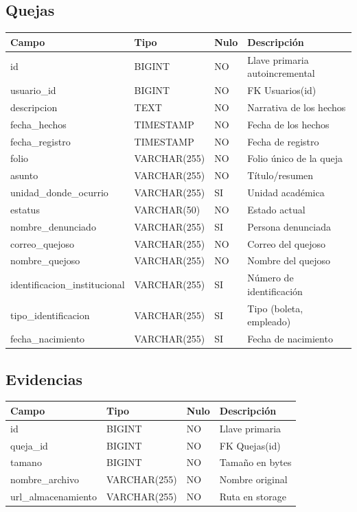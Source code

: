 \documentclass[11pt,letterpaper]{article}
\begin{document}
\subsection{Quejas}
\begin{longtable}{|p{4.2cm}|p{3.2cm}|p{2.2cm}|p{4.5cm}|}
\hline
\rowcolor{lightgray} \textbf{Campo} & \textbf{Tipo} & \textbf{Nulo} & \textbf{Descripción} \\
\hline
id & BIGINT & NO & Llave primaria autoincremental \\
\hline
usuario\_id & BIGINT & NO & FK Usuarios(id) \\
\hline
descripcion & TEXT & NO & Narrativa de los hechos \\
\hline
fecha\_hechos & TIMESTAMP & NO & Fecha de los hechos \\
\hline
fecha\_registro & TIMESTAMP & NO & Fecha de registro \\
\hline
folio & VARCHAR(255) & NO & Folio único de la queja \\
\hline
asunto & VARCHAR(255) & NO & Título/resumen \\
\hline
unidad\_donde\_ocurrio & VARCHAR(255) & SI & Unidad académica \\
\hline
estatus & VARCHAR(50) & NO & Estado actual \\
\hline
nombre\_denunciado & VARCHAR(255) & SI & Persona denunciada \\
\hline
correo\_quejoso & VARCHAR(255) & NO & Correo del quejoso \\
\hline
nombre\_quejoso & VARCHAR(255) & NO & Nombre del quejoso \\
\hline
identificacion\_institucional & VARCHAR(255) & SI & Número de identificación \\
\hline
tipo\_identificacion & VARCHAR(255) & SI & Tipo (boleta, empleado) \\
\hline
fecha\_nacimiento & VARCHAR(255) & SI & Fecha de nacimiento \\
\hline
\end{longtable}

\subsection{Evidencias}
\begin{longtable}{|p{4.2cm}|p{3.2cm}|p{2.2cm}|p{4.5cm}|}
\hline
\rowcolor{lightgray} \textbf{Campo} & \textbf{Tipo} & \textbf{Nulo} & \textbf{Descripción} \\
\hline
id & BIGINT & NO & Llave primaria \\
\hline
queja\_id & BIGINT & NO & FK Quejas(id) \\
\hline
tamano & BIGINT & NO & Tamaño en bytes \\
\hline
nombre\_archivo & VARCHAR(255) & NO & Nombre original \\
\hline
url\_almacenamiento & VARCHAR(255) & NO & Ruta en storage \\
\hline
\end{longtable}
\end{document}

